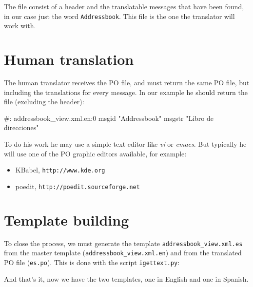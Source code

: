 The file consist of a header and the translatable messages that have been
found, in our case just the word {\tt Addressbook}. This file is the one
the translator will work with.


\section{Human translation}

The human translator receives the PO file, and must return the same PO
file, but including the translations for every message. In our example
he should return the file (excluding the header):

\begin{code}
    #: addressbook_view.xml.en:0
    msgid "Addressbook"
    msgstr "Libro de direcciones"
\end{code}

To do his work he may use a simple text editor like {\em vi} or {\em emacs}.
But typically he will use one of the PO graphic editors available, for
example:

\begin{itemize}
  \item KBabel, {\tt http://www.kde.org}
  \item poedit, {\tt http://poedit.sourceforge.net}
\end{itemize}


\section{Template building}

To close the process, we must generate the template
{\tt addressbook\_view.xml.es} from the master template
({\tt addressbook\_view.xml.en}) and from the translated PO file ({\tt es.po}).
This is done with the script {\tt igettext.py}:


And that's it, now we have the two templates, one in English and one in
Spanish.


